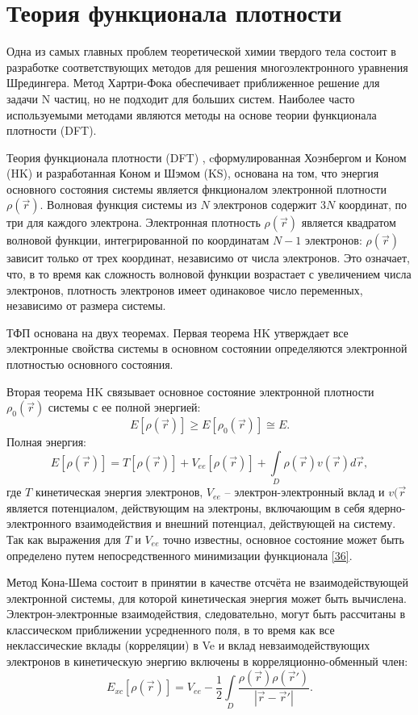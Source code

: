 \chapter{Теория функционала плотности}
Одна из самых главных проблем теоретической химии твердого тела состоит в разработке соответствующих методов для решения многоэлектронного уравнения Шредингера. Метод Хартри-Фока обеспечивает приближенное решение для задачи N частиц, но не подходит для больших систем. Наиболее часто используемыми методами являются методы на основе теории функционала плотности (DFT).

Теория функционала плотности (DFT) , cформулированная Хоэнбергом и Коном (HK) и разработанная Коном и Шэмом (KS), основана на том, что энергия основного состояния системы является фнкционалом электронной плотности \(\rho(\vec{r})\).
Волновая функция системы из \(N\) электронов содержит \(3N\) координат, по три для каждого электрона. Электронная плотность \(\rho(\vec{r})\) является квадратом волновой функции, интегрированной по координатам \(N-1\) электронов: \(\rho(\vec{r})\) зависит только от трех координат, независимо от числа электронов. Это означает, что, в то время как сложность волновой функции возрастает с увеличением числа электронов, плотность электронов имеет одинаковое число переменных, независимо от размера системы.

ТФП основана на двух теоремах. Первая теорема HK утверждает все электронные свойства системы в основном состоянии определяются электронной плотностью основного состояния.

Вторая теорема HK связывает основное состояние электронной плотности \(\rho_0(\vec{r})\) системы с ее полной энергией:
\begin{equation}
    E[\rho(\vec{r})] \ge E[\rho_0(\vec{r})] \cong E.
\end{equation}
Полная энергия:
\begin{equation}
    E[\rho(\vec{r})] = T[\rho(\vec{r})] + V_{ee}[\rho(\vec{r})]+
    \int\limits_D \rho(\vec{r}) v(\vec{r}) d\vec{r},
    \label{eq:36}
\end{equation}
где \(T\) кинетическая энергия электронов, \(V_{ee}\) -- электрон-электронный вклад и \(v(\vec{r}\) является потенциалом, действующим на электроны, включающим в себя ядерно-электронного взаимодействия и внешний потенциал, действующей на систему. Так как выражения для \( T \) и \(V_{ee}\) точно известны, основное состояние может быть определено путем непосредственного минимизации функционала \eqref{36}.

Метод Кона-Шема состоит в принятии в качестве отсчёта не взаимодействующей электронной системы, для которой кинетическая энергия может быть вычислена. Электрон-электронные взаимодействия, следовательно, могут быть рассчитаны в классическом  приближении усредненного поля, в то время как все неклассические вклады (корреляции) в Ve и вклад невзаимодействующих электронов в кинетическую энергию включены в корреляционно-обменный член:
\begin{equation}
    E_{xc}[\rho(\vec{r})] = V_{ee} - \frac{1}{2}\int\limits_{D}\frac{\rho(\vec{r})\rho(\vec{r}')}{|\vec{r} - \vec{r}'|}.
    \label{eq:37}
\end{equation}

